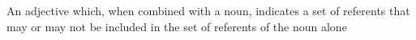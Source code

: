 An adjective which, when combined with a noun, indicates a set of referents that may or may not be included in the set of referents of the noun alone
